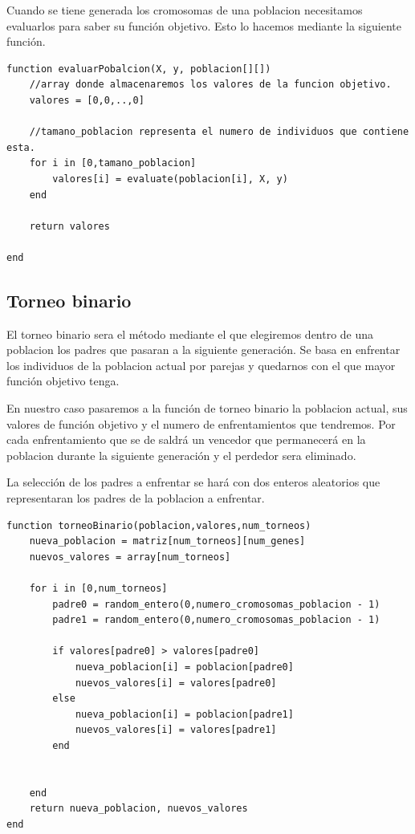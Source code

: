 \documentclass[titlepage]{article}
\begin{document}
	Cuando se tiene generada los cromosomas de una poblacion necesitamos evaluarlos para saber su función objetivo. Esto lo hacemos mediante la siguiente función.
	
	\begin{lstlisting}
function evaluarPobalcion(X, y, poblacion[][])
	//array donde almacenaremos los valores de la funcion objetivo.
	valores = [0,0,..,0]
		
	//tamano_poblacion representa el numero de individuos que contiene esta.
	for i in [0,tamano_poblacion]
		valores[i] = evaluate(poblacion[i], X, y)
	end
		
	return valores
			
end
	\end{lstlisting}
	
	\subsection{Torneo binario}
	
	El torneo binario sera el método mediante el que elegiremos dentro de una poblacion los padres que pasaran a la siguiente generación.
	Se basa en enfrentar los individuos de la poblacion actual por parejas y quedarnos con el que mayor función objetivo tenga. 
	
	En nuestro caso pasaremos a la función de torneo binario la poblacion actual, sus valores de función objetivo y el numero de enfrentamientos que tendremos. Por cada enfrentamiento que se de saldrá un vencedor que permanecerá en la poblacion durante la siguiente generación y el perdedor sera eliminado. 
	
	La selección de los padres a enfrentar se hará con dos enteros aleatorios que representaran los padres de la poblacion a enfrentar.
	\begin{lstlisting}
function torneoBinario(poblacion,valores,num_torneos)
	nueva_poblacion = matriz[num_torneos][num_genes]
	nuevos_valores = array[num_torneos]
	
	for i in [0,num_torneos]
		padre0 = random_entero(0,numero_cromosomas_poblacion - 1)
		padre1 = random_entero(0,numero_cromosomas_poblacion - 1)
		
		if valores[padre0] > valores[padre0]
			nueva_poblacion[i] = poblacion[padre0]
			nuevos_valores[i] = valores[padre0]
		else
			nueva_poblacion[i] = poblacion[padre1]
			nuevos_valores[i] = valores[padre1]
		end
		
		
	end
	return nueva_poblacion, nuevos_valores
end
	\end{lstlisting}
	
\end{document}
